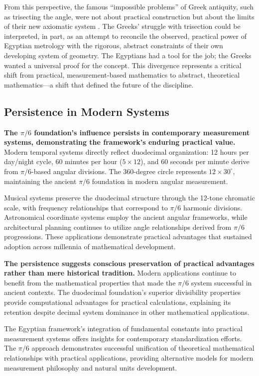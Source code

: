 \documentclass[11pt]{article}
\begin{document}
From this perspective, the famous ``impossible problems'' of Greek antiquity, such as trisecting the angle, were not about practical construction but about the limits of their new axiomatic system \cite{heath1921history}. The Greeks' struggle with trisection could be interpreted, in part, as an attempt to reconcile the observed, practical power of Egyptian metrology with the rigorous, abstract constraints of their own developing system of geometry. The Egyptians had a tool for the job; the Greeks wanted a universal proof for the concept. This divergence represents a critical shift from practical, measurement-based mathematics to abstract, theoretical mathematics—a shift that defined the future of the discipline.

\subsection{Persistence in Modern Systems}

\textbf{The $\pi/6$ foundation's influence persists in contemporary measurement systems, demonstrating the framework's enduring practical value.} Modern temporal systems directly reflect duodecimal organization: 12 hours per day/night cycle, 60 minutes per hour ($5 \times 12$), and 60 seconds per minute derive from $\pi/6$-based angular divisions. The 360-degree circle represents $12 \times 30^\circ$, maintaining the ancient $\pi/6$ foundation in modern angular measurement.

Musical systems preserve the duodecimal structure through the 12-tone chromatic scale, with frequency relationships that correspond to $\pi/6$ harmonic divisions. Astronomical coordinate systems employ the ancient angular frameworks, while architectural planning continues to utilize angle relationships derived from $\pi/6$ progressions. These applications demonstrate practical advantages that sustained adoption across millennia of mathematical development.

\textbf{The persistence suggests conscious preservation of practical advantages rather than mere historical tradition.} Modern applications continue to benefit from the mathematical properties that made the $\pi/6$ system successful in ancient contexts. The duodecimal foundation's superior divisibility properties provide computational advantages for practical calculations, explaining its retention despite decimal system dominance in other mathematical applications.

The Egyptian framework's integration of fundamental constants into practical measurement systems offers insights for contemporary standardization efforts. The $\pi/6$ approach demonstrates successful unification of theoretical mathematical relationships with practical applications, providing alternative models for modern measurement philosophy and natural units development.
\end{document}
